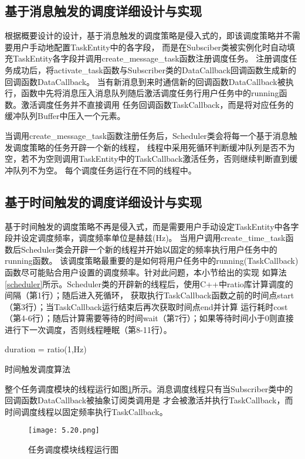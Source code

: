 \subsection{基于消息触发的调度详细设计与实现}
根据概要设计的设计，基于消息触发的调度策略是侵入式的，即该调度策略并不需要用户手动地配置TaskEntity中的各字段，
而是在Subsciber类被实例化时自动填充TaskEntity各字段并调用create\_message\_task函数注册调度任务。
注册调度任务成功后，将activate\_task函数与Subscriber类的DataCallback回调函数生成新的回调函数DataCallback。
当有新消息到来时通信新的回调函数DataCallback被执行，函数中先将消息压入消息队列随后激活调度任务行用户任务中的running函数。激活调度任务并不直接调用
任务回调函数TaskCallback，而是将对应任务的缓冲队列Buffer中压入一个元素。

当调用create\_message\_task函数注册任务后，Scheduler类会将每一个基于消息触发调度策略的任务开辟一个新的线程，
线程中采用死循环判断缓冲队列是否不为空，若不为空则调用TaskEntity中的TaskCallback激活任务，否则继续判断直到缓冲队列不为空。
每个调度任务运行在不同的线程中。

\subsection{基于时间触发的调度详细设计与实现}
基于时间触发的调度策略不再是侵入式，而是需要用户手动设定TaskEntity中各字段并设定调度频率，调度频率单位是赫兹(Hz)。
当用户调用create\_time\_task函数后Scheduler类会开辟一个新的线程并开始以固定的频率执行用户任务中的running函数。
该调度策略最重要的是如何将用户任务中的running(TaskCallback)函数尽可能贴合用户设置的调度频率。针对此问题，本小节给出的实现
如算法\ref{scheduler}所示。Scheduler类的开辟新的线程后，使用C++中ratio库计算调度的间隔（第1行）；随后进入死循环，
获取执行TaskCallback函数之前的时间点start（第3行）；当TaskCallback运行结束后再次获取时间点end并计算
运行耗时cost（第4-6行）；随后计算需要等待的时间wait（第7行）；如果等待时间小于0则直接进行下一次调度，否则线程睡眠（第8-11行）。

\begin{algorithm}[H]
  \small
  \SetAlgoLined
  duration = ratio(1,Hz)\;
  \caption{时间触发调度算法}
  \label{scheduler}
\end{algorithm}

整个任务调度模块的线程运行如图\ref{thread_running}所示。消息调度线程只有当Subscriber类中的回调函数DataCallback被抽象订阅类调用是
才会被激活并执行TaskCallback，而时间调度线程以固定频率执行TaskCallback。
\begin{figure}[H]
  \centering
  \texttt{[image: 5.20.png]}
  \caption{任务调度模块线程运行图}
  \label{thread_running}
\end{figure}


